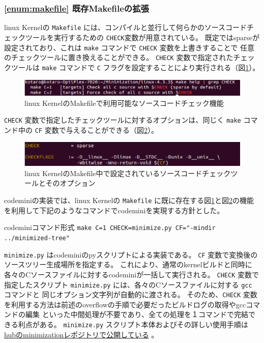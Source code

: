 \subsubsection{\ref{enum:makefile} 既存Makefileの拡張}
\acrshort{linux} Kernelの \verb|Makefile| には、コンパイルと並行して何らかのソースコードチェックツールを実行するための
\verb|CHECK|変数が用意されている。
既定では\acrshort{sparse}が設定されており、これは \verb|make| コマンドで \verb|CHECK| 変数を上書きすることで
任意のチェックツールに置き換えることができる。
\verb|CHECK| 変数で指定されたチェックツールは \verb|make| コマンドで \verb|C| フラグを設定することにより実行される（図\ref{check}）。
\begin{figure}[ht]
  \centering
  \includegraphics[width=\textwidth]{pic/check.eps}
  \caption{\acrshort{linux} KernelのMakefileで利用可能なソースコードチェック機能}
  \label{check}
\end{figure}
\par
\verb|CHECK| 変数で指定したチェックツールに対するオプションは、同じく \verb|make| コマンド中の \verb|CF| 変数で与えることができる（図\ref{cf}）。
\begin{figure}[ht]
  \centering
  \includegraphics[width=\textwidth]{pic/cf.eps}
  \caption{\acrshort{linux} KernelのMakefile中で設定されているソースコードチェックツールとそのオプション}
  \label{cf}
\end{figure}
\par
\acrshort{codemini}の実装では、\acrshort{linux} Kernelの \verb|Makefile| に既に存在する図\ref{check}と図\ref{cf}の機能を利用して下記のようなコマンドで\acrshort{codemini}を実現する方針とした。
\begin{itembox}[l]{\acrshort{codemini}コマンド形式}
  \verb|make C=1 CHECK=minimize.py CF="-mindir ../minimized-tree"|
\end{itembox}
\par
\verb|minimize.py| は\acrshort{codemini}の\acrshort{py}スクリプトによる実装である。
\verb|CF| 変数で変換後のソースツリー生成場所を指定する。
これにより、通常のkernelビルドと同時に
各々のCソースファイルに対する\acrshort{codemini}が一括して実行される。
\verb|CHECK| 変数で指定したスクリプト \verb|minimize.py| には、各々のCソースファイルに対する \verb|gcc| コマンドと
同じオプション文字列が自動的に渡される。
そのため、\verb|CHECK| 変数を利用する方法は前述の\acrshort{overflow}の手順で必要だったビルドログの取得やgccコマンドの編集
といった中間処理が不要であり、全ての処理を１コマンドで完結できる利点がある。
\verb|minimize.py| スクリプト本体およびその詳しい使用手順は
\href{https://github.com/Hitachi-India-Pvt-Ltd-RD/minimization}{\acrshort{hub}のminimizationレポジトリで公開している} \cite{minimization}。
